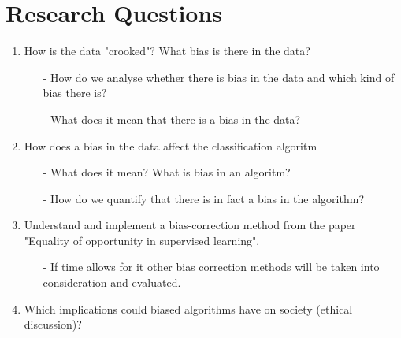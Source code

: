 \documentclass[11pt, fleqn]{article}
\begin{document}
	
	
	\section*{Research Questions}
	\begin{enumerate}
		\item How is the data "crooked"? What bias is there in the data?
		\begin{itemize}
			\item[-] How do we analyse whether there is bias in the data and which kind of bias there is? 
			\item[-] What does it mean that there is a bias in the data?
		\end{itemize}
		
		\item How does a bias in the data affect the classification algoritm
		\begin{itemize}
			\item[-] What does it mean? What is bias in an algoritm?
			\item[-] How do we quantify that there is in fact a bias in the algorithm?
		\end{itemize}
		
		\item Understand and implement a bias-correction method from the paper "Equality of opportunity in supervised learning". 
			\begin{itemize}
				\item[-] If time allows for it other bias correction methods will be taken into consideration and evaluated.
			\end{itemize}
		
		\item Which implications could biased algorithms have on society (ethical discussion)?
		
	\end{enumerate}
	
\end{document}

